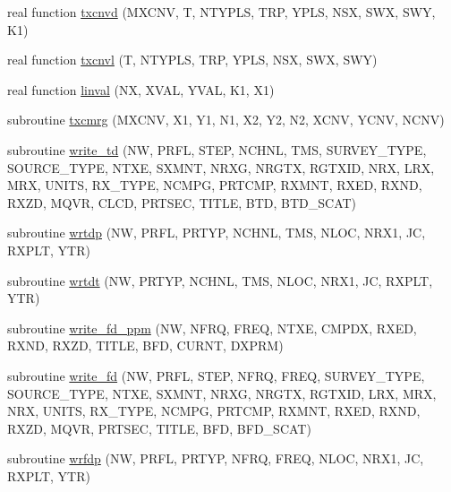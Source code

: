 \begin{DoxyCompactItemize}
\item 
real function \hyperlink{Marco_8f90_a1cdfcb6ee629073412c28d9cf0215636}{txcnvd} (M\+X\+C\+NV, T, N\+T\+Y\+P\+LS, T\+RP, Y\+P\+LS, N\+SX, S\+WX, S\+WY, K1)
\item 
real function \hyperlink{Marco_8f90_a1cb0065a1b3068676ef2beb814db93f5}{txcnvl} (T, N\+T\+Y\+P\+LS, T\+RP, Y\+P\+LS, N\+SX, S\+WX, S\+WY)
\item 
real function \hyperlink{Marco_8f90_accb3ec8ce6fe855a60b0c1959fc6e2c8}{linval} (NX, X\+V\+AL, Y\+V\+AL, K1, X1)
\item 
subroutine \hyperlink{Marco_8f90_a91b093a6d74ab88b54c4e2121d31ffa2}{txcmrg} (M\+X\+C\+NV, X1, Y1, N1, X2, Y2, N2, X\+C\+NV, Y\+C\+NV, N\+C\+NV)
\item 
subroutine \hyperlink{Marco_8f90_aad827ba2d87a213e0eb9ce15bedec51f}{write\+\_\+td} (NW, P\+R\+FL, S\+T\+EP, N\+C\+H\+NL, T\+MS, S\+U\+R\+V\+E\+Y\+\_\+\+T\+Y\+PE, S\+O\+U\+R\+C\+E\+\_\+\+T\+Y\+PE, N\+T\+XE, S\+X\+M\+NT, N\+R\+XG, N\+R\+G\+TX, R\+G\+T\+X\+ID, N\+RX, L\+RX, M\+RX, U\+N\+I\+TS, R\+X\+\_\+\+T\+Y\+PE, N\+C\+M\+PG, P\+R\+T\+C\+MP, R\+X\+M\+NT, R\+X\+ED, R\+X\+ND, R\+X\+ZD, M\+Q\+VR, C\+L\+CD, P\+R\+T\+S\+EC, T\+I\+T\+LE, B\+TD, B\+T\+D\+\_\+\+S\+C\+AT)
\item 
subroutine \hyperlink{Marco_8f90_a071a3c64cc5ab69eb6ca8b8b9371c9f4}{wrtdp} (NW, P\+R\+FL, P\+R\+T\+YP, N\+C\+H\+NL, T\+MS, N\+L\+OC, N\+R\+X1, JC, R\+X\+P\+LT, Y\+TR)
\item 
subroutine \hyperlink{Marco_8f90_a39656ce23a727d198891a5951d6ba7c9}{wrtdt} (NW, P\+R\+T\+YP, N\+C\+H\+NL, T\+MS, N\+L\+OC, N\+R\+X1, JC, R\+X\+P\+LT, Y\+TR)
\item 
subroutine \hyperlink{Marco_8f90_a6c5a9a67801add3eebe2342e6b8ce010}{write\+\_\+fd\+\_\+ppm} (NW, N\+F\+RQ, F\+R\+EQ, N\+T\+XE, C\+M\+P\+DX, R\+X\+ED, R\+X\+ND, R\+X\+ZD, T\+I\+T\+LE, B\+FD, C\+U\+R\+NT, D\+X\+P\+RM)
\item 
subroutine \hyperlink{Marco_8f90_a369920397ca735b23d30254943dc7811}{write\+\_\+fd} (NW, P\+R\+FL, S\+T\+EP, N\+F\+RQ, F\+R\+EQ, S\+U\+R\+V\+E\+Y\+\_\+\+T\+Y\+PE, S\+O\+U\+R\+C\+E\+\_\+\+T\+Y\+PE, N\+T\+XE, S\+X\+M\+NT, N\+R\+XG, N\+R\+G\+TX, R\+G\+T\+X\+ID, L\+RX, M\+RX, N\+RX, U\+N\+I\+TS, R\+X\+\_\+\+T\+Y\+PE, N\+C\+M\+PG, P\+R\+T\+C\+MP, R\+X\+M\+NT, R\+X\+ED, R\+X\+ND, R\+X\+ZD, M\+Q\+VR, P\+R\+T\+S\+EC, T\+I\+T\+LE, B\+FD, B\+F\+D\+\_\+\+S\+C\+AT)
\item 
subroutine \hyperlink{Marco_8f90_a325ce1448f0d02be280b64103f3b4793}{wrfdp} (NW, P\+R\+FL, P\+R\+T\+YP, N\+F\+RQ, F\+R\+EQ, N\+L\+OC, N\+R\+X1, JC, R\+X\+P\+LT, Y\+TR)

\end{DoxyCompactItemize}
